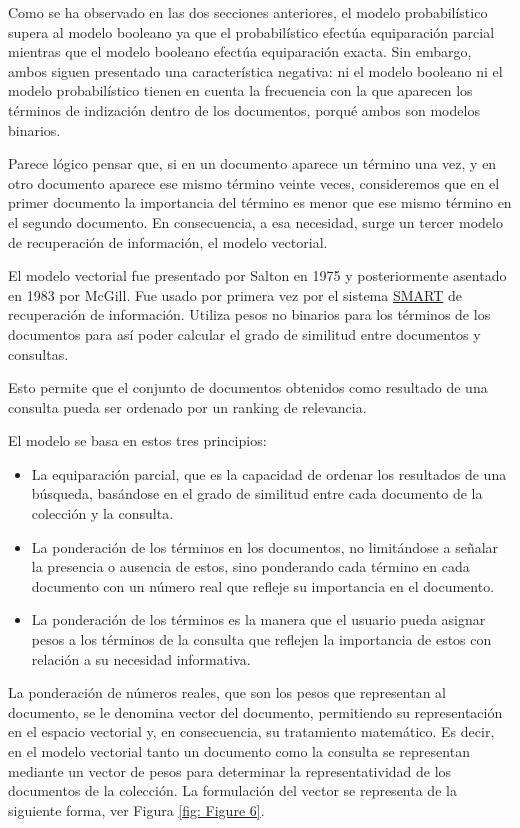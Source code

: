\documentclass[titlepage]{article}
\begin{document}
Como se ha observado en las dos secciones anteriores, el modelo probabilístico supera al modelo booleano ya que el probabilístico efectúa equiparación parcial mientras que el modelo booleano efectúa equiparación exacta. Sin embargo, ambos siguen presentado una característica negativa: ni el modelo booleano ni el modelo probabilístico tienen en cuenta la frecuencia con la que aparecen los términos de indización dentro de los documentos, porqué ambos son modelos binarios.

Parece lógico pensar que, si en un documento aparece un término una vez, y en otro documento aparece ese mismo término veinte veces, consideremos que en el primer documento la importancia del término es menor que ese mismo término en el segundo documento. En consecuencia, a esa necesidad, surge un tercer modelo de recuperación de información, el modelo vectorial.

El modelo vectorial fue presentado por Salton\cite{salton} en 1975 y posteriormente asentado en 1983 por McGill\cite{mcgill}. Fue usado por primera vez por el sistema \href{https://en.wikipedia.org/wiki/SMART_Information_Retrieval_System}{SMART} de recuperación de información. Utiliza pesos no binarios para los términos de los documentos para así poder calcular el grado de similitud entre documentos y consultas.  

Esto permite que el conjunto de documentos obtenidos como resultado de una consulta pueda ser ordenado por un ranking de relevancia. 

El modelo se basa en estos tres principios:

\begin{itemize}
	\item La equiparación parcial, que es la capacidad de ordenar los resultados de una búsqueda, basándose en el grado de similitud entre cada documento de la colección y la consulta.
	\item La ponderación de los términos en los documentos, no limitándose a señalar la presencia o ausencia de estos, sino ponderando cada término en cada documento con un número real que refleje su importancia en el documento.
	\item La ponderación de los términos es la manera que el usuario pueda asignar pesos a los términos de la consulta que reflejen la importancia de estos con relación a su necesidad informativa.
\end{itemize}

La ponderación de números reales, que son los pesos que representan al documento, se le denomina vector del documento, permitiendo su representación en el espacio vectorial y, en consecuencia, su tratamiento matemático. Es decir, en el modelo vectorial tanto un documento como la consulta se representan mediante un vector de pesos para determinar la representatividad de los documentos de la colección. La formulación del vector se representa de la siguiente forma, ver Figura \ref{fig: Figure 6}.
\end{document}
